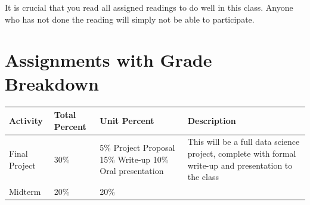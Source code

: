 \documentclass[
]{book}
\begin{document}
It is crucial that you read all assigned readings to do well in this class. Anyone who has not done the reading will simply not be able to participate.

\hypertarget{assignments-with-grade-breakdown}{%
\section{Assignments with Grade Breakdown}\label{assignments-with-grade-breakdown}}

\begin{longtable}[]{@{}llll@{}}
\toprule
\begin{minipage}[b]{0.22\columnwidth}\raggedright
Activity\strut
\end{minipage} & \begin{minipage}[b]{0.22\columnwidth}\raggedright
Total Percent\strut
\end{minipage} & \begin{minipage}[b]{0.22\columnwidth}\raggedright
Unit Percent\strut
\end{minipage} & \begin{minipage}[b]{0.22\columnwidth}\raggedright
Description\strut
\end{minipage}\tabularnewline
\midrule
\endhead
\begin{minipage}[t]{0.22\columnwidth}\raggedright
Final Project\strut
\end{minipage} & \begin{minipage}[t]{0.22\columnwidth}\raggedright
30\%\strut
\end{minipage} & \begin{minipage}[t]{0.22\columnwidth}\raggedright
5\% Project Proposal 15\% Write-up 10\% Oral presentation\strut
\end{minipage} & \begin{minipage}[t]{0.22\columnwidth}\raggedright
This will be a full data science project, complete with formal write-up and presentation to the class\strut
\end{minipage}\tabularnewline
\begin{minipage}[t]{0.22\columnwidth}\raggedright
Midterm\strut
\end{minipage} & \begin{minipage}[t]{0.22\columnwidth}\raggedright
20\%\strut
\end{minipage} & \begin{minipage}[t]{0.22\columnwidth}\raggedright
20\%\strut
\end{minipage} & \begin{minipage}[t]{0.22\columnwidth}\raggedright

\end{minipage}
\end{longtable}
\end{document}

